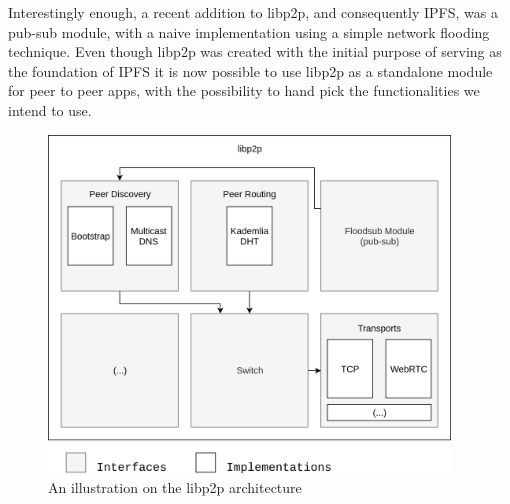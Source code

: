 Interestingly enough, a recent addition to libp2p, and consequently IPFS, was a
pub-sub module, with a naive implementation using a simple network flooding
technique. Even though libp2p was created with the initial purpose of serving
as the foundation of IPFS it is now possible to use libp2p as a standalone
module for peer to peer apps, with the possibility to hand pick the
functionalities we intend to use.

\begin{figure}[hb!]
  \centering
  \includegraphics[width=0.95\textwidth]{img/libp2p-arch.png}
  \caption{An illustration on the libp2p architecture}
  \label{fig:ipfs-arch}
\end{figure}
